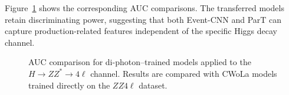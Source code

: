\documentclass[12pt]{article}
\begin{document}
        Figure~\ref{fig:CWoLa_CNN_ParT_diphoton_apply_ZZ4l} shows the corresponding AUC comparisons. The transferred models retain discriminating power, suggesting that both Event-CNN and ParT can capture production-related features independent of the specific Higgs decay channel.
        \begin{figure}[htpb]
            \centering
            \caption{AUC comparison for di-photon–trained models applied to the $H \to ZZ^* \to 4\ell$ channel. Results are compared with CWoLa models trained directly on the $ZZ4\ell$ dataset.}
            \label{fig:CWoLa_CNN_ParT_diphoton_apply_ZZ4l}
        \end{figure}




\end{document}

